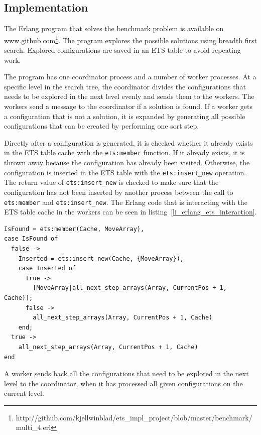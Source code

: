 \documentclass[aps,pre,preprint,nofootinbib]{revtex4}
\begin{document}
\subsection{Implementation}
The Erlang program that solves the benchmark problem is available on www.github.com\footnote{http://github.com/kjellwinblad/ets\_impl\_project/blob/master/benchmark/multi\_4.erl}.
The program explores the possible solutions using breadth first search.
Explored configurations are saved in an ETS table to avoid repeating work.

The program has one coordinator process and a number of worker processes.
At a specific level in the search tree, the coordinator divides the configurations that needs to be explored in the next level evenly and sends them to the workers.
The workers send a message to the coordinator if a solution is found.
If a worker gets a configuration that is not a solution, it is expanded by generating all possible configurations that can be created by performing one sort step.

Directly after a configuration is generated, it is checked whether it already exists in the ETS table cache with the \verb|ets:member| function.
If it already exists, it is thrown away because the configuration has already been visited.
Otherwise, the configuration is inserted in the ETS table with the \verb|ets:insert_new| operation.
The return value of \verb|ets:insert_new| is checked to make sure that the configuration has not been inserted by another process between the call to \verb|ets:member| and \verb|ets:insert_new|.
The Erlang code that is interacting with the ETS table cache in the workers can be seen in listing~\ref{li_erlang_ets_interaction}.

\lstset{language=erlang, caption=Worker code that is interacting with ETS, label=li_erlang_ets_interaction}
\begin{lstlisting}[float=htb]
  IsFound = ets:member(Cache, MoveArray),
case IsFound of
  false ->
    Inserted = ets:insert_new(Cache, {MoveArray}),
    case Inserted of
      true ->
        [MoveArray|all_next_step_arrays(Array, CurrentPos + 1, Cache)];
      false ->
        all_next_step_arrays(Array, CurrentPos + 1, Cache)
    end;
  true ->
    all_next_step_arrays(Array, CurrentPos + 1, Cache)
end
\end{lstlisting}

A worker sends back all the configurations that need to be explored in the next level to the coordinator, when it has processed all given configurations on the current level.
\end{document}
